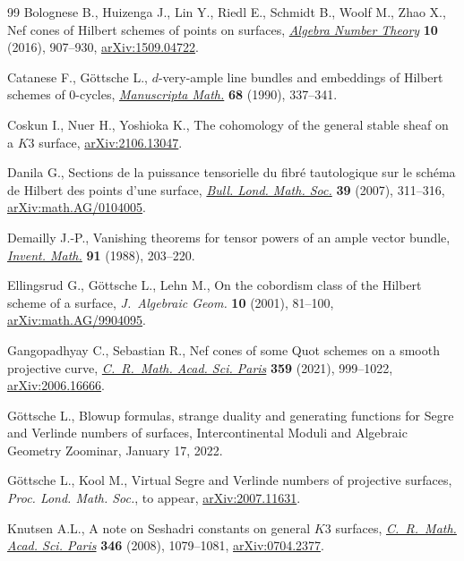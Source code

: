 \documentclass[10pt,a4paper]{amsart}
\numberwithin{equation}{section}
\begin{document}
\begin{thebibliography}{99}
Bolognese B., Huizenga J., Lin Y., Riedl E., Schmidt B., Woolf M., Zhao X., Nef
 cones of {H}ilbert schemes of points on surfaces, \href{https://doi.org/10.2140/ant.2016.10.907}{\textit{Algebra Number
 Theory}} \textbf{10} (2016), 907--930, \href{https://arxiv.org/abs/1509.04722}{arXiv:1509.04722}.

Catanese F., G\"ottsche L., {$d$}-very-ample line bundles and embeddings of
 {H}ilbert schemes of {$0$}-cycles, \href{https://doi.org/10.1007/BF02568768}{\textit{Manuscripta Math.}} \textbf{68}
 (1990), 337--341.

Coskun I., Nuer H., Yoshioka K., The cohomology of the general stable sheaf on
 a $K3$ surface, \href{https://arxiv.org/abs/2106.13047}{arXiv:2106.13047}.

Danila G., Sections de la puissance tensorielle du fibr\'e tautologique sur le
 sch\'ema de {H}ilbert des points d'une surface, \href{https://doi.org/10.1112/blms/bdl035}{\textit{Bull. Lond. Math.
 Soc.}} \textbf{39} (2007), 311--316, \href{https://arxiv.org/abs/math.AG/0104005}{arXiv:math.AG/0104005}.

Demailly J.-P., Vanishing theorems for tensor powers of an ample vector bundle,
 \href{https://doi.org/10.1007/BF01404918}{\textit{Invent. Math.}} \textbf{91} (1988), 203--220.

Ellingsrud G., G\"ottsche L., Lehn M., On the cobordism class of the {H}ilbert
 scheme of a surface, \textit{J.~Algebraic Geom.} \textbf{10} (2001), 81--100,
 \href{https://arxiv.org/abs/math.AG/9904095}{arXiv:math.AG/9904095}.

Gangopadhyay C., Sebastian R., Nef cones of some {Q}uot schemes on a smooth
 projective curve, \href{https://doi.org/10.5802/crmath.245}{\textit{C.~R.~Math. Acad. Sci. Paris}} \textbf{359} (2021),
 999--1022, \href{https://arxiv.org/abs/2006.16666}{arXiv:2006.16666}.

G\"ottsche L., Blowup formulas, strange duality and generating functions for
 Segre and Verlinde numbers of surfaces, {I}ntercontinental Moduli and
 Algebraic Geometry Zoominar, January 17, 2022.

G\"ottsche L., Kool M., Virtual Segre and Verlinde numbers of projective
 surfaces, \textit{Proc. Lond. Math. Soc.}, {t}o appear, \href{https://arxiv.org/abs/2007.11631}{arXiv:2007.11631}.

Knutsen A.L., A note on {S}eshadri constants on general {$K3$} surfaces,
 \href{https://doi.org/10.1016/j.crma.2008.09.008}{\textit{C.~R.~Math. Acad. Sci. Paris}} \textbf{346} (2008), 1079--1081,
 \href{https://arxiv.org/abs/0704.2377}{arXiv:0704.2377}.


\end{thebibliography}
\end{document}
